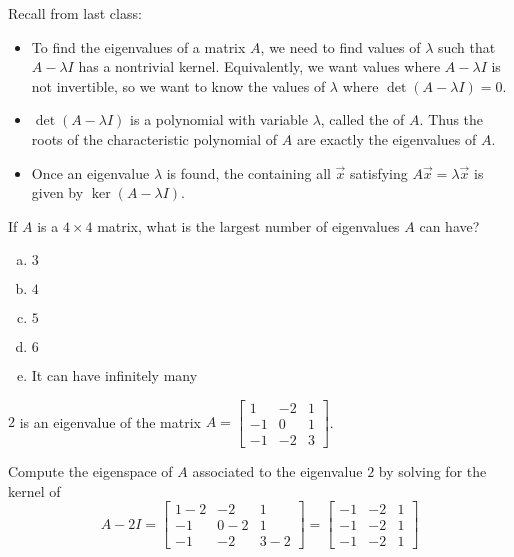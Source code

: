 
\begin{applicationActivities}{4}{28}
\begin{observation}
Recall from last class:
\begin{itemize}
\item To find the eigenvalues of a matrix $A$, we need to find values of $\lambda$ such that $A-\lambda I$ has a nontrivial kernel. Equivalently,
we want values where $A-\lambda I$ is not invertible, so we want to know
the values of \(\lambda\) where $\det(A-\lambda I)=0$.
\item $\det(A-\lambda I)$ is a polynomial with variable \(\lambda\),
called the  of $A$. Thus the roots of
the characteristic polynomial of \(A\) are exactly the eigenvalues of \(A\).
\item Once an eigenvalue \(\lambda\) is found, the 
containing all  \(\vec x\) satisfying
\(A\vec x=\lambda\vec x\) is given by $\ker(A-\lambda I)$.
\end{itemize}
\end{observation}

\begin{activity}{5}
  If $A$ is a $4 \times 4$ matrix, what is the largest number of eigenvalues $A$ can have?
  \begin{enumerate}[(a)]
  \item $3$
  \item $4$
  \item $5$
  \item $6$
  \item It can have infinitely many
  \end{enumerate}
\end{activity}

\begin{activity}{5}
  $2$ is an eigenvalue of the matrix $A=\begin{bmatrix} 1 & -2 & 1 \\ -1 & 0 & 1 \\ -1 & -2 & 3\end{bmatrix}$.

  Compute the eigenspace of $A$ associated to the eigenvalue $2$ by
  solving for the kernel of
  \[
    A-2I
      =
    \begin{bmatrix}
      1-2 & -2 & 1 \\
      -1 & 0-2 & 1 \\
      -1 & -2 & 3-2
    \end{bmatrix}
      =
    \begin{bmatrix}
      -1 & -2 & 1 \\
      -1 & -2 & 1 \\
      -1 & -2 & 1
    \end{bmatrix}
  \]
\end{activity}


\end{applicationActivities}
